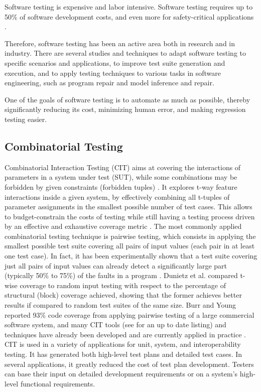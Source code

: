 \documentclass [a4paper, 12pt, twoside]{report}
\theoremstyle{plain}
\theoremstyle{definition}
\theoremstyle{remark}
\theoremstyle{plain}
\theoremstyle{plain}
\theoremstyle{remark}
\begin{document}
Software testing is expensive and labor intensive. Software testing requires up to 50\% of software development costs, and even more for safety-critical applications \cite{testingbook}.

Therefore, software testing has been an active area both in research and in industry.
There are several studies and techniques to adapt software testing to specific scenarios and applications, to improve test suite generation and execution, and to apply testing techniques to various tasks in software engineering, such as program repair and model inference and repair. 

One of the goals of software testing is to automate as much as possible, thereby significantly reducing its cost, minimizing human error, and making regression testing easier. \cite{testingbook}

\subsection{Combinatorial Testing}
Combinatorial Interaction Testing (CIT) aims at covering the interactions of parameters in a system under test (SUT), while some combinations may be forbidden by given constraints (forbidden tuples) \cite{yamada_greedy_2016}.
It explores t-way feature interactions inside a given system, by effectively combining all t-tuples of parameter assignments in the smallest possible number of test cases.
This allows to budget-constrain the costs of testing while still having a testing process driven by an effective and exhaustive coverage metric \cite{AETG,KuhnTSE04}. 
The most commonly applied combinatorial testing technique is pairwise testing, which consists in applying the smallest possible test suite covering all pairs of input values (each pair in at least one test case). 
In fact, it has been experimentally shown that a test suite covering just all pairs of input values can already detect a significantly large part (typically 50\% to 75\%) of the faults in a program \cite{Dalal:ICSE99, IPO}.
Dunietz et al. \cite{Dunietz:ICSE97} compared t-wise coverage to random input testing with respect to the percentage of structural (block) coverage achieved, showing that the former achieves better results if compared to random test suites of the same size. 
Burr and Young \cite{burr98} reported 93\% code coverage from applying pairwise testing of a large commercial software system, and many CIT tools (see \cite{pairwise} for an up to date listing) and techniques have already been developed \cite{AETGT.ISSRE.1998,GrindalSTVR05,KuhnTSE04} and are currently applied in practice \cite{OATS,Kuhn02,Smith}. 
CIT is used in a variety of applications for unit, system, and interoperability testing. 
It has generated both high-level test plans and detailed test cases. In several applications, it greatly reduced the cost of test plan development. Testers can base their input on detailed development requirements or on a system's high-level functional requirements.
\end{document}
